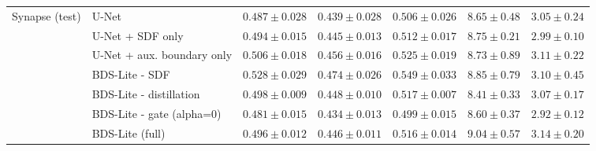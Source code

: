 \begin{tabular}{llccccc}
\midrule
Synapse (test) & U-Net & $0.487 \pm 0.028$ & $0.439 \pm 0.028$ & $0.506 \pm 0.026$ & $8.65 \pm 0.48$ & $3.05 \pm 0.24$ \\
 & U-Net + SDF only & $0.494 \pm 0.015$ & $0.445 \pm 0.013$ & $0.512 \pm 0.017$ & $8.75 \pm 0.21$ & $2.99 \pm 0.10$ \\
 & U-Net + aux. boundary only & $0.506 \pm 0.018$ & $0.456 \pm 0.016$ & $0.525 \pm 0.019$ & $8.73 \pm 0.89$ & $3.11 \pm 0.22$ \\
 & BDS-Lite - SDF & $0.528 \pm 0.029$ & $0.474 \pm 0.026$ & $0.549 \pm 0.033$ & $8.85 \pm 0.79$ & $3.10 \pm 0.45$ \\
 & BDS-Lite - distillation & $0.498 \pm 0.009$ & $0.448 \pm 0.010$ & $0.517 \pm 0.007$ & $8.41 \pm 0.33$ & $3.07 \pm 0.17$ \\
 & BDS-Lite - gate (alpha=0) & $0.481 \pm 0.015$ & $0.434 \pm 0.013$ & $0.499 \pm 0.015$ & $8.60 \pm 0.37$ & $2.92 \pm 0.12$ \\
 & BDS-Lite (full) & $0.496 \pm 0.012$ & $0.446 \pm 0.011$ & $0.516 \pm 0.014$ & $9.04 \pm 0.57$ & $3.14 \pm 0.20$ \\
\bottomrule
\end{tabular}
